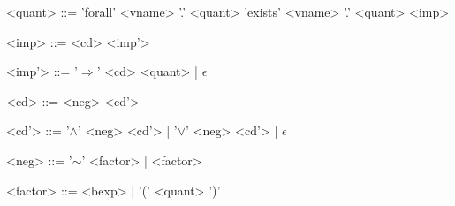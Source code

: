 \begin{grammar}
<quant> ::= 'forall' <vname> '.' <quant>
\alt 'exists' <vname> '.' <quant>
\alt <imp>

<imp> ::= <cd> <imp'>

<imp'> ::= '$\Rightarrow$' <cd> <quant> | $\epsilon$

<cd> ::= <neg> <cd'>

<cd'> ::= '$\wedge$' <neg> <cd'> | '$\vee$' <neg> <cd'> | $\epsilon$

<neg> ::= '$\sim$' <factor> | <factor>

<factor> ::=  <bexp> | '(' <quant> ')'
\end{grammar}
